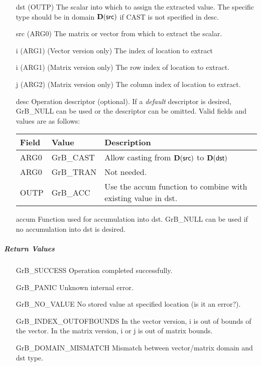 \begin{itemize}[leftmargin=1in]
    \item[{\sf dst}]   (OUTP) The scalar into which to assign the extracted value.  The specific type should be in domain $\bold{D}({\sf src})$ if {\sf CAST} is not specified in {\sf desc}.
    \item[{\sf src}]   (ARG0) The matrix or vector from which to extract the scalar.
    \item[{\sf i}]     (ARG1) (Vector version only) The index of location to extract
    \item[{\sf i}]     (ARG1) (Matrix version only) The row index of location to extract.
    \item[{\sf j}]     (ARG2) (Matrix version only) The column index of location to extract.

    \item[{\sf desc}]   Operation descriptor (optional). If a
    \emph{default} descriptor is desired, {\sf GrB\_NULL} can be
    used or the descriptor can be omitted.  Valid fields and values are as follows: \\
    \begin{tabular}{lll}
    Field  & Value & Description \\
    \hline
    {\sf ARG0} & {\sf GrB\_CAST} & Allow casting from $\bold{D}({\sf src})$ to $\bold{D}({\sf dst})$ \\
    {\sf ARG0} & {\sf GrB\_TRAN} & Not needed. \\
    {\sf OUTP} & {\sf GrB\_ACC}  & Use the {\sf accum} function to combine with existing value in {\sf dst}.\\
    \end{tabular}

    \item[{\sf accum}] Function used for accumulation into dst.  {\sf GrB\_NULL}
                       can be used if no accumulation into dst is desired.
\end{itemize}


\subparagraph{Return Values}

\begin{itemize}[leftmargin=2.1in]
\item[{\sf GrB\_SUCCESS}]          Operation completed successfully.
\item[{\sf GrB\_PANIC}]            Unknown internal error.
\item[{\sf GrB\_NO\_VALUE}]        No stored value at specified location (is it an error?).
\item[{\sf GrB\_INDEX\_OUTOFBOUNDS}]  In the vector version, {\sf i} is out of 
                                      bounds of the vector.  In the matrix version,
                                      {\sf i} or {\sf j} is out of matrix bounds.
\item[{\sf GrB\_DOMAIN\_MISMATCH}]    Mismatch between vector/matrix domain and {\sf dst} type.
\end{itemize}

